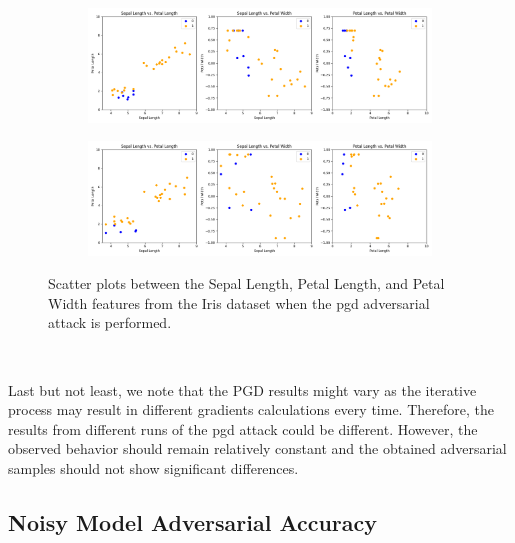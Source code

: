 \begin{figure}[!h]
  \ContinuedFloat
  \centering

  \begin{subfigure}{\textwidth}
      \includegraphics[width=\linewidth]{figures/adversarial_analysis/adversarial-pgd-0.7.png}
      \label{fig:adv9}
  \end{subfigure}

  \begin{subfigure}{\textwidth}
    \includegraphics[width=\linewidth]{figures/adversarial_analysis/adversarial-pgd-0.9.png}
    \label{fig:adv10}
  \end{subfigure}

  \caption{Scatter plots between the Sepal Length, Petal Length, and Petal Width features from the Iris dataset when the \ac{pgd} adversarial attack is performed.}
  \label{fig:adv-pgd}
\end{figure} \

Last but not least, we note that the PGD results might
vary as the iterative process may result in different
gradients calculations every time. Therefore, the
results from different runs of the \ac{pgd} attack
could be different. However, the observed behavior
should remain relatively constant and the obtained
adversarial samples should not show significant
differences. \

\subsection{Noisy Model Adversarial Accuracy}\label{subsection:noisy_adv_acc} \

